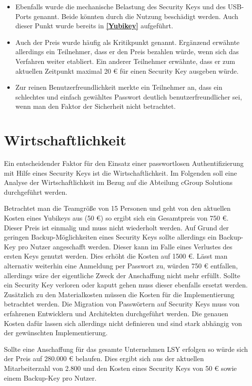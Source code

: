 \begin{itemize}
    \item Ebenfalls wurde die mechanische Belastung des Security Keys und des USB-Ports genannt. Beide könnten durch die Nutzung beschädigt werden. Auch dieser Punkt wurde bereits in \textbf{\ref{Yubikey}} aufgeführt.
    \item Auch der Preis wurde häufig als Kritikpunkt genannt. Ergänzend erwähnte allerdings ein Teilnehmer, dass er den Preis bezahlen würde, wenn sich das Verfahren weiter etabliert. Ein anderer Teilnehmer erwähnte, dass er zum aktuellen Zeitpunkt maximal 20 € für einen Security Key ausgeben würde.
    \item Zur reinen Benutzerfreundlichkeit merkte ein Teilnehmer an, dass ein schlechtes und einfach gewähltes Passwort deutlich benutzerfreundlicher sei, wenn man den Faktor der Sicherheit nicht betrachtet.
\end{itemize}


\section{Wirtschaftlichkeit}
Ein entscheidender Faktor für den Einsatz einer passwortlosen Authentifizierung mit Hilfe eines Security Keys ist die Wirtschaftlichkeit. Im Folgenden soll eine Analyse der Wirtschaftlichkeit im Bezug auf die Abteilung cGroup Solutions durchgeführt werden.

Betrachtet man die Teamgröße von 15 Personen und geht von den aktuellen Kosten eines Yubikeys aus (50 €) so ergibt sich ein Gesamtpreis von 750 €. Dieser Preis ist einmalig und muss nicht wiederholt werden. Auf Grund der geringen Backup-Möglichkeiten eines Security Keys sollte allerdings ein Backup-Key pro Nutzer angeschafft werden. Dieser kann im Falle eines Verlustes des ersten Keys genutzt werden. Dies erhöht die Kosten auf 1500 €.
Lässt man alternativ weiterhin eine Anmeldung per Passwort zu, würden 750 € entfallen, allerdings wäre der eigentliche Zweck der Anschaffung nicht mehr erfüllt.
Sollte ein Security Key verloren oder kaputt gehen muss dieser ebenfalls ersetzt werden.
Zusätzlich zu den Materialkosten müssen die Kosten für die Implementierung betrachtet werden. Die Migration von Passwörtern auf Security Keys muss von erfahrenen Entwicklern und Architekten durchgeführt werden. Die genauen Kosten dafür lassen sich allerdings nicht definieren und sind stark abhängig von der gewünschten Implementierung. 

Sollte eine Anschaffung für das gesamte Unternehmen \ac{LSY} erfolgen so würde sich der Preis auf 280.000 € belaufen. Dies ergibt sich aus der aktuellen Mitarbeiterzahl von 2.800 und den Kosten eines Security Keys von 50 € sowie einem Backup-Key pro Nutzer.

